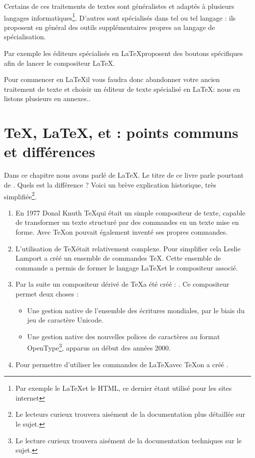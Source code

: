 Certains de ces traitements de textes sont généralistes et adaptés à plusieurs langages informatiques\footnote{Par exemple le \LaTeX et le HTML, ce dernier étant utilisé pour les sites internet}. D'autres sont spécialisés dans tel ou tel langage : ils proposent en général des outils supplémentaires propres au langage de spécialisation. 

Par exemple les éditeurs spécialisés en \LaTeX proposent des boutons spécifiques afin de lancer le compositeur \LaTeX.

Pour commencer en \LaTeX il vous faudra donc abandonner votre ancien traitement de texte et choisir un éditeur de texte spécialisé en \LaTeX : nous en listons plusieurs en annexes..

\section[TeX, LaTeX, XeTeX, XeLaTeX : points communs et différences]{\TeX, \LaTeX, \XeTeX et \XeLaTeX : points communs et différences}

Dans ce chapitre nous avons parlé de \LaTeX. Le titre de ce livre parle pourtant  de \XeLaTeX. Quels est la différence ? Voici un brève explication historique, très simplifiée\footnote{Le lecteurs curieux trouvera aisément de la documentation plus détaillée sur le sujet.}.

\begin{enumerate}
\item En 1977 Donal Knuth \TeX qui était un simple compositeur de texte, capable de transformer un texte structuré par des commandes en un texte mise en forme. Avec \TeX on pouvait également inventé ses propres commandes.
\item L'utilisation de \TeX était relativement complexe. Pour simplifier cela Leslie Lamport a créé un ensemble de commandes \TeX. Cette ensemble de commande a permis de former le langage \LaTeX et le compositeur associé.
\item Par la suite un compositeur dérivé de \TeX a été créé : \XeTeX. Ce compositeur permet deux choses :
\begin{itemize}
	\item Une gestion native de l'ensemble des écritures mondiales, par le biais du jeu de caractère Unicode.
	\item Une gestion native des nouvelles polices de caractères au format OpenType\footnote{Le lecture curieux trouvera aisément de la documentation techniques sur le sujet.}, apparus au début des années 2000.

\end{itemize} 
\item Pour permettre d'utiliser les commandes de \LaTeX avec \TeX on a créé \XeLaTeX.
\end{enumerate}

